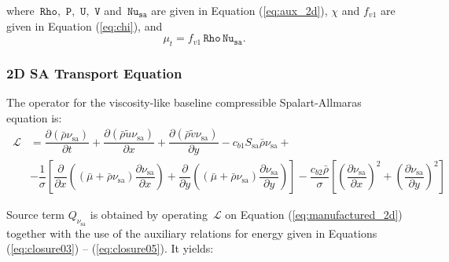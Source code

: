 \documentclass[10pt]{article}
\newcommand{\Diff}[2] {\dfrac{\partial( #1)}{\partial #2}}
\newcommand{\diff}[2] {\dfrac{\partial #1}{\partial #2}}
\newcommand{\Rho}{\,\mathtt{Rho}}
\newcommand{\PP}{\,\mathtt{P}}
\newcommand{\U}{\,\mathtt{U}}
\newcommand{\V}{\,\mathtt{V}}
\newcommand{\Nu}{\,\mathtt{Nu_{sa}}}
\newcommand{\Lo}{\,\mathcal{L}}
\newcommand{\sa}{\nu_{\mathrm{sa}}}
\newcommand{\tsa}{\mathrm{sa}}
\newcommand{\brho}{\bar{\rho}}
\newcommand{\tu}{\tilde{u}}
\newcommand{\tv}{\tilde{v}}
\newcommand{\bmu}{\bar{\mu}}
\begin{document}
where  $\Rho,\,\PP,\, \U,\,\V$ and $\Nu$ are given in Equation (\ref{eq:aux_2d}),  $\chi$ and $f_{v1}$ are given in  Equation (\ref{eq:chi}),   and  $$\mu_t= f_{v1} \Rho \Nu.$$


\subsubsection{2D SA Transport Equation}

The operator for the viscosity-like baseline compressible Spalart-Allmaras equation is:
\begin{equation*}
\begin{split}
\Lo&=  \Diff{\brho \sa }{t}+ \Diff{\brho \tu \sa }{x}+\Diff{\brho \tv \sa}{y}- c_{b1} S_\tsa \bar{\rho} \sa +\\
   &- \dfrac{1 }{\sigma}\left[\diff{}{x}\left((\bmu+\bar{\rho} \sa) \diff{\sa}{x}\right)+\diff{}{y}\left((\bmu+\bar{\rho} \sa) \diff{\sa}{y}\right)\right] -\dfrac{c_{b2} \bar{\rho} }{\sigma} \left[ \left(\diff{\sa}{x}\right)^2 + \left(\diff{\sa}{y}\right)^2\right]
\end{split}
\end{equation*}

Source term $Q_{\sa}$ is obtained by operating $\Lo$ on Equation  (\ref{eq:manufactured_2d}) together with the use of the  auxiliary relations for energy given in Equations (\ref{eq:closure03}) -- (\ref{eq:closure05}). It yields:
\end{document}
